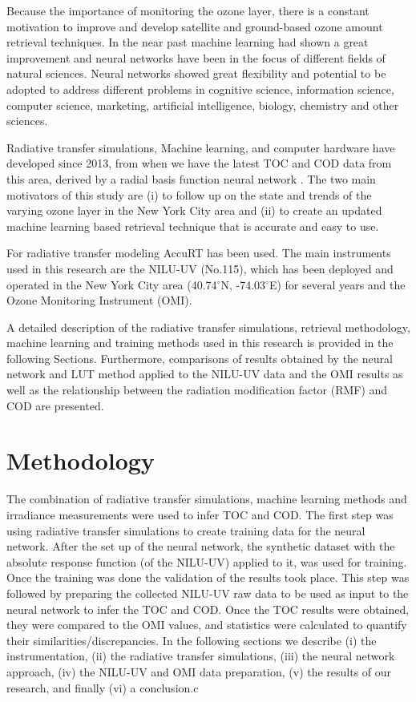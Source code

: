 \documentclass{optica-article}
\begin{document}
Because the importance of monitoring the ozone layer, there is a constant motivation to improve and develop satellite and ground-based ozone amount retrieval techniques. 
In the near past machine learning had shown a great improvement and neural networks have been in the focus of different fields of natural sciences. 
Neural networks showed great flexibility and potential to be adopted to address different problems in cognitive science, information science, computer science, marketing, artificial intelligence, biology, chemistry and other sciences.

Radiative transfer simulations, Machine learning, and computer hardware have developed since 2013, from when we have the latest TOC and COD data from this area, derived by a radial basis function neural network \cite{Fan:2014}.
The two main motivators of this study are 
(i) to follow up on the state and trends of the varying ozone layer in the New York City area and 
(ii) to create an updated machine learning based retrieval technique that is accurate and easy to use.

For radiative transfer modeling AccuRT has been used. 
The main instruments used in this research are the NILU-UV (No.115), which  has been deployed and operated in the New York City area (40.74$^\circ$N, -74.03$^\circ$E) for several years and the Ozone Monitoring Instrument (OMI).

A detailed description of the radiative transfer simulations, retrieval methodology, machine learning and training methods used in this research is provided in the following Sections.
Furthermore, comparisons of results obtained by the neural network and LUT method applied to the NILU-UV data and the OMI results as well as the relationship between the radiation modification factor (RMF) and COD are presented.


\section{Methodology}
\label{sec-method}

The combination of radiative transfer simulations, machine learning methods and irradiance measurements were used to infer TOC and COD. 
The first step was using radiative transfer simulations to create training data for the neural network. 
After the set up of the neural network, the synthetic dataset with the absolute response function (of the NILU-UV) applied to it, was used for training. 
Once the training was done the validation of the results took place. 
This step was followed by preparing the collected NILU-UV raw data to be used as input to the neural network to infer the TOC and COD. Once the TOC results were obtained, they were compared to the OMI values, and statistics were calculated to quantify their similarities/discrepancies.
In the following sections we describe (i) the instrumentation, (ii) the radiative transfer simulations, (iii) the neural network approach, (iv) the NILU-UV and OMI data preparation, (v) the results of our research, and finally (vi) a conclusion.c	
\end{document}
